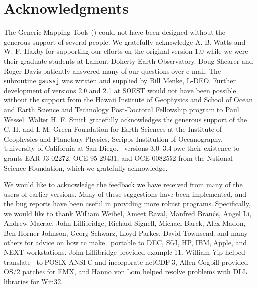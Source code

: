 %
%


\chapter*{Acknowledgments}

The Generic Mapping Tools (\GMT) could not have been designed without
the generous support of several people.  We gratefully acknowledge
A. B. Watts and W. F. Haxby for supporting our efforts on the original
version 1.0 while we were their graduate students at Lamont-Doherty
Earth Observatory.  Doug Shearer and Roger Davis patiently answered
many of our questions over e-mail.  The subroutine \texttt{gaussj} was
written and supplied by Bill Menke, L-DEO.
Further development of versions 2.0 and 2.1 at SOEST would not have
been possible without the support from the Hawaii Institute of
Geophysics and School of Ocean and Earth Science and Technology
Post-Doctoral Fellowship program to Paul Wessel.  Walter H. F. Smith
gratefully acknowledges the generous support of the C. H. and I. M.
Green Foundation for Earth Sciences at the Institute of Geophysics
and Planetary Physics, Scripps Institution of Oceanography, University
of California at San Diego.
\GMT\ versions 3.0--3.4 owe their existence to grants EAR-93-02272, OCE-95-29431,
and OCE-0082552 from the National Science Foundation, which we
gratefully acknowledge.

We would like to acknowledge the feedback we have received from many
of the users of earlier versions.  Many of these suggestions have
been implemented, and the bug reports have been useful in providing
more robust programs.  Specifically, we would like to thank William
Weibel, Ameet Raval, Manfred Brands, Angel Li, Andrew Macrae, John
Lillibridge, Richard Signell, Michael Barck, Alex Madon, Ben Horner-Johnson,
Georg Schwarz, Lloyd Parkes, David Townsend, and many others for
advice on how to make \GMT\ portable to DEC, SGI, HP, IBM, Apple, and
NEXT workstations.  John Lillibridge provided example 11.  William
Yip helped translate \GMT\ to POSIX ANSI C and incorporate netCDF 3, 
Allen Cogbill provided OS/2 patches for EMX, and Hanno von Lom helped
resolve problems with DLL libraries for Win32.

